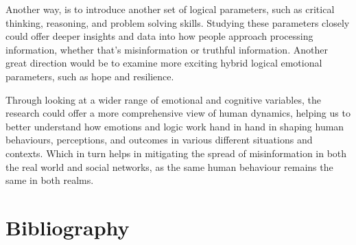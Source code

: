 \documentclass[twocolumn, a4paper, 12pt]{article}
\begin{document}
Another way, is to introduce another set of logical parameters, such as critical thinking, reasoning, and problem solving skills. Studying these parameters closely could offer deeper insights and data into how people approach processing information, whether that's misinformation or truthful information. Another great direction would be to examine more exciting hybrid logical emotional parameters, such as hope and resilience.

Through looking at a wider range of emotional and cognitive variables, the research could offer a more comprehensive view of human dynamics, helping us to better understand how emotions and logic work hand in hand in shaping human behaviours, perceptions, and outcomes in various different situations and contexts. Which in turn helps in mitigating the spread of misinformation in both the real world and social networks, as the same human behaviour remains the same in both realms.


\section{Bibliography}
\printbibliography[heading=none]
\end{document}
